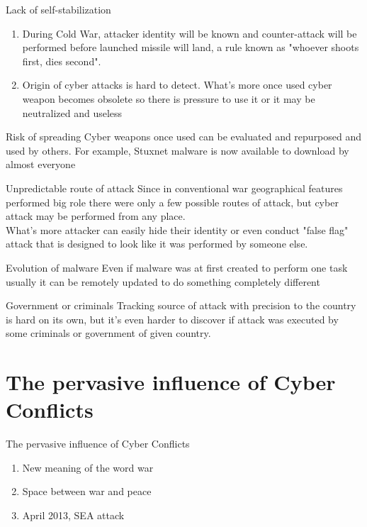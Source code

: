 \documentclass[xcolor=table]{beamer}
\begin{document}
\begin{frame}{Lack of self-stabilization}
\begin{enumerate}
\item \Large{During Cold War, attacker identity will be known and counter-attack will be performed before launched missile will land, a rule known as "whoever shoots first, dies second".}
\item \Large{Origin of cyber attacks is hard to detect. What's more once used  cyber weapon becomes obsolete so there is pressure to use it or it may be neutralized and useless}
\end{enumerate}
\end{frame}

\begin{frame}{Risk of spreading}
\Large{Cyber weapons once used can be evaluated and repurposed and used by others. For example, Stuxnet malware is now available to download by almost everyone}
\end{frame}

\begin{frame}{Unpredictable route of attack}
\Large{Since in conventional war geographical features performed big role there were only a few possible routes of attack, but cyber attack may be performed from any place.
\\

What's more attacker can easily hide their identity or even conduct "false flag" attack that is designed to look like it was performed by someone else.}
\end{frame}

\begin{frame}{Evolution of malware}
\Large{Even if malware was at first created to perform one task usually it can be remotely updated to do something completely different}
\end{frame}

\begin{frame}{Government or criminals}
\Large{Tracking source of attack with precision to the country is hard on its own, but it's even harder to discover if attack was executed by some criminals or government of given country.}
\end{frame}
\section{The pervasive influence of Cyber Conflicts}
\begin{frame}{The pervasive influence of Cyber Conflicts}
	\begin{enumerate}
	\item New meaning of the word war
\item Space between war and peace
\item April 2013, SEA attack
	\end{enumerate}
\end{frame}
\end{document}
